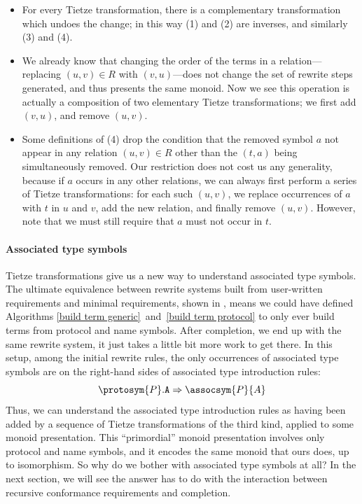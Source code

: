 \documentclass[../generics]{subfiles}
\begin{document}
\begin{itemize}
\item For every Tietze transformation, there is a complementary transformation which undoes the change; in this way (1) and (2) are inverses, and similarly (3) and (4).

\item We already know that changing the order of the terms in a relation---replacing $(u,v)\in R$ with $(v,u)$---does not change the set of rewrite steps generated, and thus presents the same monoid. Now we see this operation is actually a composition of two elementary Tietze transformations; we first add $(v,u)$, and remove $(u,v)$.

\item Some definitions of (4) drop the condition that the removed symbol $a$ not appear in any relation $(u,v)\in R$ other than the $(t,a)$ being simultaneously removed. Our restriction does not cost us any generality, because if $a$ occurs in any other relations, we can always first perform a series of Tietze transformations: for each such $(u,v)$, we replace occurrences of $a$ with $t$ in $u$ and $v$, add the new relation, and finally remove $(u,v)$. However, note that we must still require that $a$ must not occur in $t$.
\end{itemize}

\paragraph{Associated type symbols} Tietze transformations give us a new way to understand associated type symbols. The ultimate equivalence between rewrite systems built from user-written requirements and minimal requirements, shown in , means we could have defined Algorithms \ref{build term generic}~and~\ref{build term protocol} to only ever build terms from protocol and name symbols. After completion, we end up with the same rewrite system, it just takes a little bit more work to get there. In this setup, among the initial rewrite rules, the only occurrences of associated type symbols are on the right-hand sides of associated type introduction rules:
\[\protosym{P}.\texttt{A}\Rightarrow\assocsym{P}{A}\]
Thus, we can understand the associated type introduction rules as having been added by a sequence of Tietze transformations of the third kind, applied to some monoid presentation. This ``primordial'' monoid presentation involves only protocol and name symbols, and it encodes the same monoid that ours does, up to isomorphism. So why do we bother with associated type symbols at all? In the next section, we will see the answer has to do with the interaction between recursive conformance requirements and completion.
\end{document}
